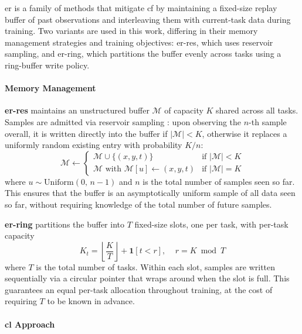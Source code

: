 \gls{er} \cite{ll_exp_replay_2019} is a family of methods that mitigate \gls{cf} by maintaining a fixed-size replay buffer of past observations and interleaving them with current-task data during training. Two variants are used in this work, differing in their memory management strategies and training objectives: \gls{er-res}, which uses reservoir sampling, and \gls{er-ring}, which partitions the buffer evenly across tasks using a ring-buffer write policy.

\paragraph{Memory Management}
\textbf{\gls{er-res}} maintains an unstructured buffer $\mathcal{M}$ of capacity $K$ shared across all tasks. Samples are admitted via reservoir sampling \cite{ll_reservoir_sampling}: upon observing the $n$-th sample overall, it is written directly into the buffer if $|\mathcal{M}| < K$, otherwise it replaces a uniformly random existing entry with probability $K/n$:
%
\begin{equation}\label{eqn:reservoir}
    \mathcal{M} \leftarrow
    \begin{cases}
        \mathcal{M} \cup \{(x, y, t)\} & \text{if } |\mathcal{M}| < K \\
        \mathcal{M} \text{ with } \mathcal{M}[u] \leftarrow (x, y, t) & \text{if } |\mathcal{M}| = K
    \end{cases}
\end{equation}
where $u \sim \mathrm{Uniform}(0,\, n{-}1)$ and $n$ is the total number of samples seen so far.
%
This ensures that the buffer is an asymptotically uniform sample of all data seen so far, without requiring knowledge of the total number of future samples.

\textbf{\gls{er-ring}} partitions the buffer into $T$ fixed-size slots, one per task, with per-task capacity
%
\begin{equation}\label{eqn:er_ring_capacity}
    K_t = \left\lfloor \frac{K}{T} \right\rfloor + \mathbf{1}[t < r], \;\;\;\; r = K \bmod T
\end{equation}
%
where $T$ is the total number of tasks. Within each slot, samples are written sequentially via a circular pointer that wraps around when the slot is full.
This guarantees an equal per-task allocation throughout training, at the cost of requiring $T$ to be known in advance.

\paragraph{\gls{cl} Approach}

